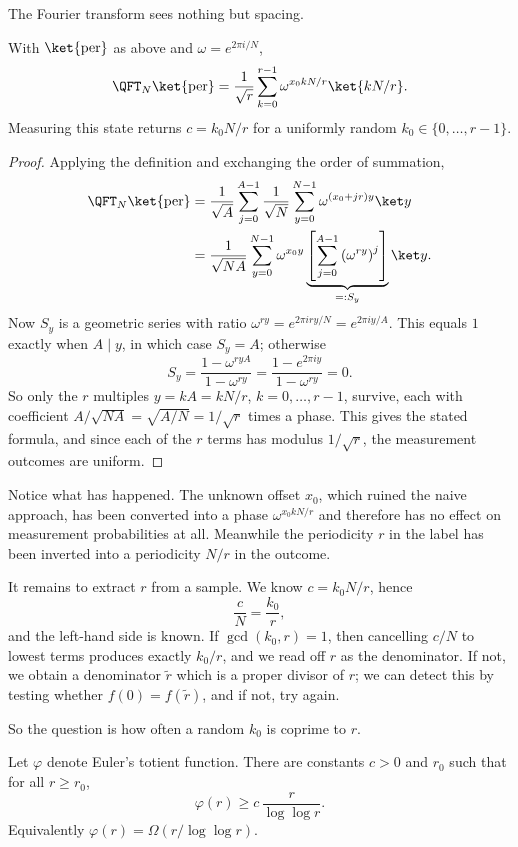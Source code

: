 The Fourier transform sees nothing but spacing.

\begin{theorem}
	With $\ket{\mathrm{per}}$ as above and $\omega = e^{2\pi i/N}$,
	$$\QFT_N\ket{\mathrm{per}} = \frac1{\sqrt r}\sum_{k=0}^{r-1}\omega^{x_0kN/r}\ket{kN/r}.$$
	Measuring this state returns $c = k_0N/r$ for a uniformly random $k_0\in\{0,\dots,r-1\}$.
\end{theorem}

\begin{proof}
	Applying the definition and exchanging the order of summation,
	\begin{align*}
		\QFT_N\ket{\mathrm{per}} &= \frac1{\sqrt A}\sum_{j=0}^{A-1}\frac{1}{\sqrt N}\sum_{y=0}^{N-1}\omega^{(x_0+jr)y}\ket y \\
		&= \frac1{\sqrt{NA}}\sum_{y=0}^{N-1}\omega^{x_0y}\underbrace{\left[\sum_{j=0}^{A-1}\left(\omega^{ry}\right)^j\right]}_{=:S_y}\ket y.
	\end{align*}
	Now $S_y$ is a geometric series with ratio $\omega^{ry} = e^{2\pi i ry/N} = e^{2\pi iy/A}$. This equals $1$ exactly when $A \mid y$, in which case $S_y = A$; otherwise
	$$S_y = \frac{1-\omega^{ryA}}{1-\omega^{ry}} = \frac{1 - e^{2\pi i y}}{1-\omega^{ry}} = 0.$$
	So only the $r$ multiples $y = kA = kN/r$, $k = 0,\dots,r-1$, survive, each with coefficient $A/\sqrt{NA} = \sqrt{A/N} = 1/\sqrt r$ times a phase. This gives the stated formula, and since each of the $r$ terms has modulus $1/\sqrt r$, the measurement outcomes are uniform.
\end{proof}

Notice what has happened. The unknown offset $x_0$, which ruined the naive approach, has been converted into a phase $\omega^{x_0kN/r}$ and therefore has no effect on measurement probabilities at all. Meanwhile the periodicity $r$ in the label has been inverted into a periodicity $N/r$ in the outcome.

It remains to extract $r$ from a sample. We know $c = k_0N/r$, hence
$$\frac{c}{N} = \frac{k_0}{r},$$
and the left-hand side is known. If $\gcd(k_0,r)=1$, then cancelling $c/N$ to lowest terms produces exactly $k_0/r$, and we read off $r$ as the denominator. If not, we obtain a denominator $\widetilde r$ which is a proper divisor of $r$; we can detect this by testing whether $f(0) = f(\widetilde r)$, and if not, try again.

So the question is how often a random $k_0$ is coprime to $r$.

\begin{theorem}
	Let $\varphi$ denote Euler's totient function. There are constants $c>0$ and $r_0$ such that for all $r\geq r_0$,
	$$\varphi(r)\geq c\,\frac{r}{\log\log r}.$$
	Equivalently $\varphi(r) = \Omega(r/\log\log r)$.
\end{theorem}

